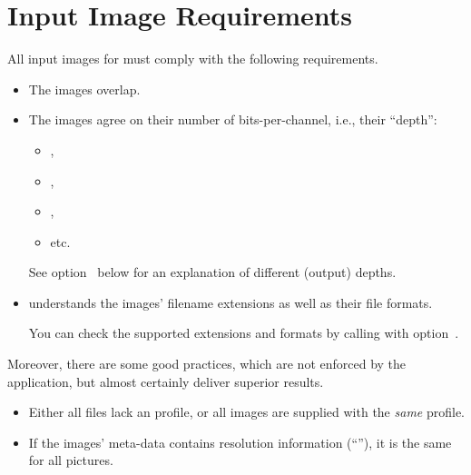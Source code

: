 

\section[Image Requirements]{\label{sec:image-requirements}%
  Input Image Requirements}

All input images for \App{} must comply with the following requirements.

\begin{itemize}
\item
  The images overlap.

\item
  The images agree on their number of bits-per-channel, i.e., their ``depth'':
  \begin{itemize}
  \item
    ,
  \item
    ,
  \item
    ,
  \item
    etc.
  \end{itemize}

  See option~ below for an explanation of different (output) depths.

\item
  \App{} understands the images' filename extensions as well as their file formats.

  You can check the supported extensions and formats by calling \App{} with
  option~.
\end{itemize}

Moreover, there are some good practices, which are not enforced by the application, but almost
certainly deliver superior results.

\begin{itemize}
\item
  Either all files lack an  profile, or all images are supplied with the
  \emph{same}  profile.

\item
  If the images' meta-data contains resolution information (``''), it is the same
  for all pictures.
\end{itemize}


